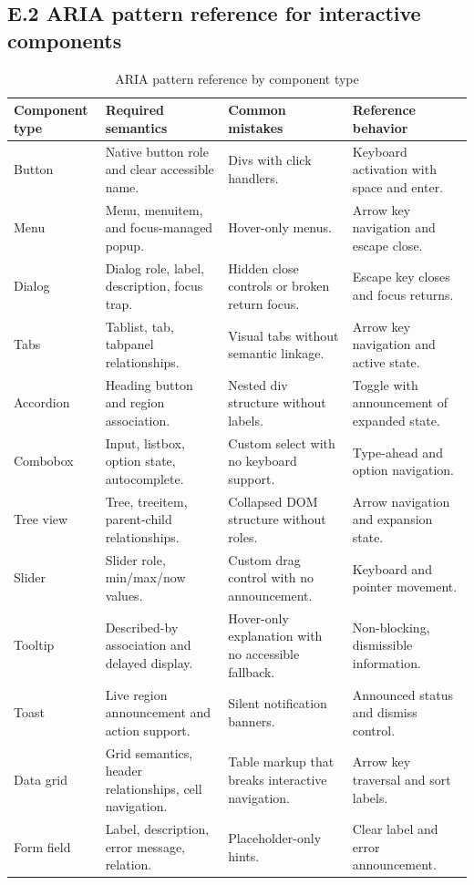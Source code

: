 \subsection*{E.2 ARIA pattern reference for interactive components}
\begin{table}[htbp]
  \centering
  \caption{ARIA pattern reference by component type}
  \begin{tabularx}{\textwidth}{@{}p{}p{}p{}Y@{}}
    \toprule
    \textbf{Component type} & \textbf{Required semantics} & \textbf{Common mistakes} & \textbf{Reference behavior} \\
    \midrule
    Button & Native button role and clear accessible name. & Divs with click handlers. & Keyboard activation with space and enter. \\
    Menu & Menu, menuitem, and focus-managed popup. & Hover-only menus. & Arrow key navigation and escape close. \\
    Dialog & Dialog role, label, description, focus trap. & Hidden close controls or broken return focus. & Escape key closes and focus returns. \\
    Tabs & Tablist, tab, tabpanel relationships. & Visual tabs without semantic linkage. & Arrow key navigation and active state. \\
    Accordion & Heading button and region association. & Nested div structure without labels. & Toggle with announcement of expanded state. \\
    Combobox & Input, listbox, option state, autocomplete. & Custom select with no keyboard support. & Type-ahead and option navigation. \\
    Tree view & Tree, treeitem, parent-child relationships. & Collapsed DOM structure without roles. & Arrow navigation and expansion state. \\
    Slider & Slider role, min/max/now values. & Custom drag control with no announcement. & Keyboard and pointer movement. \\
    Tooltip & Described-by association and delayed display. & Hover-only explanation with no accessible fallback. & Non-blocking, dismissible information. \\
    Toast & Live region announcement and action support. & Silent notification banners. & Announced status and dismiss control. \\
    Data grid & Grid semantics, header relationships, cell navigation. & Table markup that breaks interactive navigation. & Arrow key traversal and sort labels. \\
    Form field & Label, description, error message, relation. & Placeholder-only hints. & Clear label and error announcement. \\
    \bottomrule
  \end{tabularx}
\end{table}


